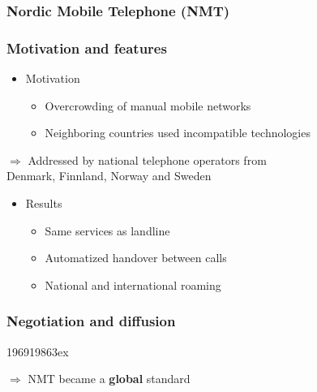 \begin{frame}
  \frametitle{Nordic Mobile Telephone (NMT)}
  
  \begin{center}
  \end{center}
\end{frame}

\begin{frame}
  \frametitle{Motivation and features}
  
    \begin{itemize}
     \item Motivation
     \begin{itemize}
      \item Overcrowding of manual mobile networks
      \item Neighboring countries used incompatible technologies
     \end{itemize}
    \end{itemize}
    
    \begin{center}
     $\Rightarrow$ Addressed by national telephone operators from\\Denmark, Finnland, Norway and Sweden
    \end{center}
    
    \begin{itemize}
     \item Results
      \begin{itemize}
	\item Same services as landline
        \item Automatized handover between calls
        \item National and international roaming
      \end{itemize}
    \end{itemize}
\end{frame}

\begin{frame}
  \frametitle{Negotiation and diffusion}
  
  \begin{chrono}[10]{1969}{1986}{3ex}{\textwidth}
  \end{chrono}
  
  \begin{center}
     $\Rightarrow$ NMT became a \textbf{global} standard
    \end{center}
\end{frame}

